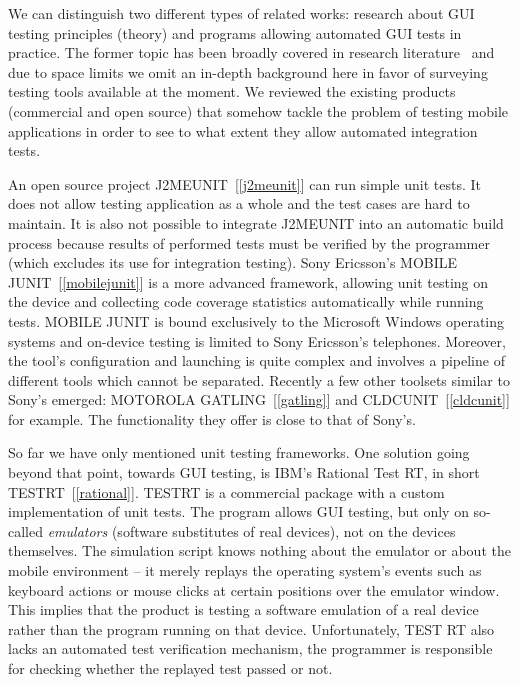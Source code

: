 \documentclass{llncs}
\newcommand{\customtextsc}[1]{{\scriptsize \MakeUppercase{#1}}}
\newcommand{\acro}[1]{\customtextsc{#1}}   %
\newcommand{\gui}{\acro{gui}}              %
\newcommand{\pcite}[1]{[\ref{#1}]}         %
\begin{document}
We can distinguish two different types of related works: research about \gui{} testing principles
(theory) and programs allowing automated \gui{} tests in practice. The former topic has been broadly
covered in research literature~\cite{tcs,softqualiteng,emost} and due to space limits we omit an
in-depth background here in favor of surveying testing tools available at the moment.
We reviewed the existing products (commercial and open source) that somehow tackle
the problem of testing mobile applications in order to see to what extent they allow automated
integration tests.

An open source project \acro{J2MEUnit}~\pcite{j2meunit} can run simple unit tests. It does not allow
testing application as a whole and the test cases are hard to maintain. It is also not possible to
integrate \acro{J2MEUnit} into an automatic build process because results of performed tests must be
verified by the programmer (which excludes its use for integration testing). Sony Ericsson's \acro{Mobile
JUnit}~\pcite{mobilejunit} is a more advanced framework, allowing unit testing on the device and
collecting code coverage statistics automatically while running tests. \acro{Mobile JUnit} is bound
exclusively to the Microsoft Windows operating systems and on-device testing is limited to
Sony Ericsson's telephones. Moreover, the tool's configuration and launching is quite complex and 
involves a pipeline of different tools which cannot be separated. Recently a few other toolsets similar to Sony's emerged:
\acro{Motorola Gatling}~\pcite{gatling} and \acro{CLDCUnit}~\pcite{cldcunit} for example. The functionality they offer
is close to that of Sony's.

So far we have only mentioned unit testing frameworks. One solution going beyond that point,
towards \gui{} testing, is IBM's Rational Test RT, in short \acro{TestRT}~\pcite{rational}. \acro{TestRT} is a commercial package
with a custom implementation of unit tests. The program allows \gui{} testing, but only on so-called
\emph{emulators} (software substitutes of real devices), not on the devices themselves. The simulation
script knows nothing about the emulator or about the mobile environment -- it merely replays
the operating system's events such as keyboard actions or mouse clicks at certain positions over the
emulator window. This implies that the product is testing a software emulation of a real
device rather than the program running on that device. Unfortunately, \acro{Test RT} also lacks an automated test
verification mechanism, the programmer is responsible for checking whether the replayed test passed or not.
\end{document}

